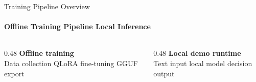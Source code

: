 \begin{frame}{Training Pipeline Overview}
  \framesubtitle{Offline Training Pipeline \textrightarrow{} Local Inference}
  \begin{center}
    \scalebox{0.60}{}
  \end{center}
  \vspace{-0.25cm}
  \begin{columns}[T,onlytextwidth]
    \begin{column}{0.48\textwidth}
      {\footnotesize\textbf{Offline training}}\\[-0.02cm]
      {\footnotesize Data collection \textrightarrow{} QLoRA fine-tuning \textrightarrow{} GGUF export}
    \end{column}
    \begin{column}{0.48\textwidth}
      {\footnotesize\textbf{Local demo runtime}}\\[-0.02cm]
      {\footnotesize Text input \textrightarrow{} local model \textrightarrow{} decision output}
    \end{column}
  \end{columns}
\end{frame}
